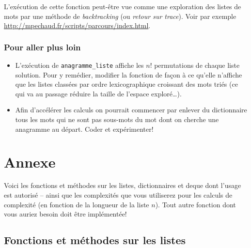 \documentclass[10pt]{article}
\begin{document}
\medskip

L'exécution de cette fonction peut-être vue comme une exploration des
listes de mots par une méthode de \emph{backtracking} (ou \emph{retour
  sur trace}). Voir par exemple
\url{http://mpechaud.fr/scripts/parcours/index.html}.

\medskip

\subsubsection*{Pour aller plus loin}

\begin{itemize}
\item L'exécution de \verb+anagramme_liste+ affiche les $n!$
  permutations de chaque liste solution. Pour y remédier, modifier la
  fonction de façon à ce qu'elle n'affiche que les listes classées par
  ordre lexicographique croissant des mots triés (ce qui va au passage
  réduire la taille de l'espace exploré\dots).
\item Afin d'accélérer les calculs on pourrait commencer par enlever
  du dictionnaire tous les mots qui ne sont pas sous-mots du mot dont
  on cherche une anagramme au départ. Coder et expérimenter!
\end{itemize}

\appendix

\section*{Annexe}


Voici les fonctions et méthodes sur les listes, dictionnaires et deque
dont l'usage est autorisé -- ainsi que les complexités que vous
utiliserez pour les calculs de complexité (en fonction de la longueur
de la liste $n$). Tout autre fonction dont vous auriez besoin doit
être implémentée!

\subsection*{Fonctions et méthodes sur les listes}
\end{document}
